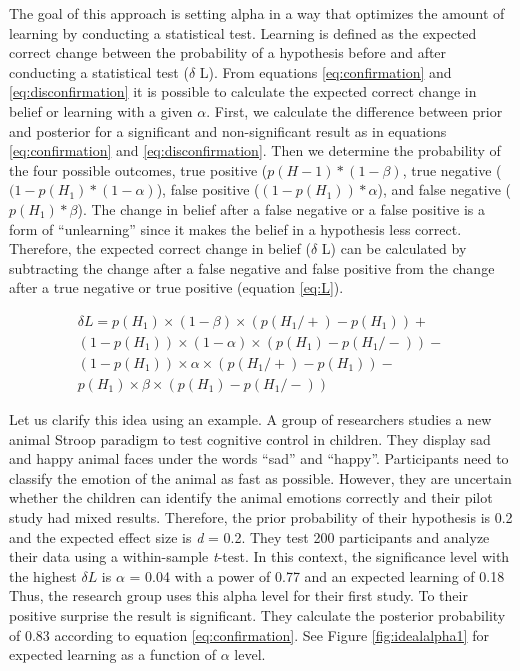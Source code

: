 \documentclass[
  english,
  ,jou,floatsintext]{apa6}
\begin{document}
The goal of this approach is setting alpha in a way that optimizes the amount of learning by conducting a statistical test. Learning is defined as the expected correct change between the probability of a hypothesis before and after conducting a statistical test (\(\delta\) L). From equations \ref{eq:confirmation} and \ref{eq:disconfirmation} it is possible to calculate the expected correct change in belief or learning with a given \(\alpha\). First, we calculate the difference between prior and posterior for a significant and non-significant result as in equations \ref{eq:confirmation} and \ref{eq:disconfirmation}. Then we determine the probability of the four possible outcomes, true positive (\(p(H-1)*(1-\beta)\), true negative (\((1-p(H_1)*(1-\alpha)\)), false positive (\((1-p(H_1))*\alpha\)), and false negative (\(p(H_1)*\beta\)). The change in belief after a false negative or a false positive is a form of ``unlearning'' since it makes the belief in a hypothesis less correct. Therefore, the expected correct change in belief (\(\delta\) L) can be calculated by subtracting the change after a false negative and false positive from the change after a true negative or true positive (equation \ref{eq:L}).

\begin{equation}
\label{eq:L}
\begin{aligned}
\delta L = p(H_1) \times (1-\beta) \times (p(H_1/+)-p(H_1))+ \\ (1-p(H_1)) \times (1-\alpha) \times (p(H_1)-p(H_1/-)) - \\ (1-p(H_1)) \times \alpha \times (p(H_1/+)- p(H_1))- \\ p(H_1) \times \beta \times (p(H_1)-p(H_1/-))
\end{aligned}
\end{equation}

Let us clarify this idea using an example. A group of researchers studies a new animal Stroop paradigm to test cognitive control in children. They display sad and happy animal faces under the words ``sad'' and ``happy''. Participants need to classify the emotion of the animal as fast as possible. However, they are uncertain whether the children can identify the animal emotions correctly and their pilot study had mixed results. Therefore, the prior probability of their hypothesis is 0.2 and the expected effect size is \emph{d} = 0.2. They test 200 participants and analyze their data using a within-sample \emph{t}-test. In this context, the significance level with the highest \(\delta L\) is \(\alpha\) = 0.04 with a power of 0.77 and an expected learning of 0.18 Thus, the research group uses this alpha level for their first study. To their positive surprise the result is significant. They calculate the posterior probability of 0.83 according to equation \ref{eq:confirmation}. See Figure \ref{fig:idealalpha1} for expected learning as a function of \(\alpha\) level.
\end{document}
